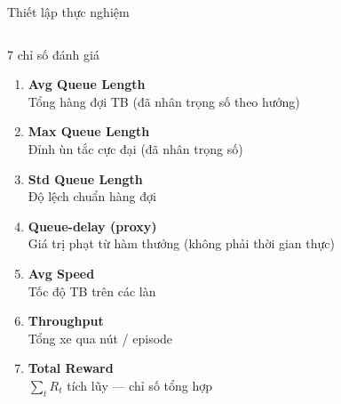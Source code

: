 \begin{frame}{Thiết lập thực nghiệm}
\begin{columns}[T]
        \begin{block}{7 chỉ số đánh giá}
      \begin{enumerate}
        \item \textbf{Avg Queue Length}\\
          Tổng hàng đợi TB (đã nhân trọng số theo hướng)
        \vspace{4pt}
        \item \textbf{Max Queue Length}\\
          Đỉnh ùn tắc cực đại (đã nhân trọng số)
        \vspace{4pt}
        \item \textbf{Std Queue Length}\\
          Độ lệch chuẩn hàng đợi
        \vspace{4pt}
        \item \textbf{Queue-delay (proxy)}\\
          Giá trị phạt từ hàm thưởng (không phải thời gian thực)
        \vspace{4pt}
        \item \textbf{Avg Speed}\\
          Tốc độ TB trên các làn
        \vspace{4pt}
        \item \textbf{Throughput}\\
          Tổng xe qua nút / episode
        \vspace{4pt}
        \item \textbf{Total Reward}\\
          $\sum_t R_t$ tích lũy --- chỉ số tổng hợp
      \end{enumerate}
    \end{block}
  \end{columns}
\end{frame}

